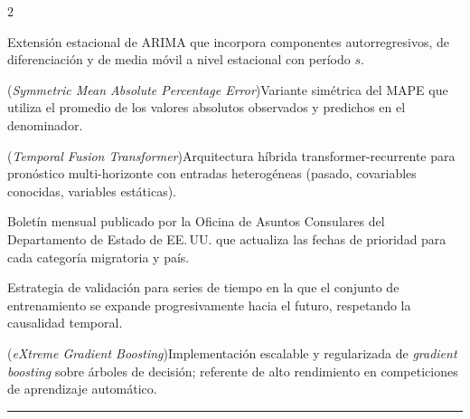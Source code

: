 \documentclass[12pt,letterpaper]{report}
\begin{document}
\begin{multicols}{2}
\begin{description}[leftmargin=0pt, labelindent=0pt, itemindent=0pt,
                    labelsep=0.4em, font=\bfseries\scriptsize,
                    itemsep=2pt, parsep=0pt, topsep=0pt]
    \item[SARIMA] Extensión estacional de ARIMA que incorpora componentes autorregresivos, de diferenciación y de media móvil a nivel estacional con período $s$.

    \item[sMAPE] (\textit{Symmetric Mean Absolute Percentage Error})\hspace{0.3em}Variante simétrica del MAPE que utiliza el promedio de los valores absolutos observados y predichos en el denominador.

    \item[TFT] (\textit{Temporal Fusion Transformer})\hspace{0.3em}Arquitectura híbrida transformer-recurrente para pronóstico multi-horizonte con entradas heterogéneas (pasado, covariables conocidas, variables estáticas).

    \item[\textit{Visa Bulletin}] Boletín mensual publicado por la Oficina de Asuntos Consulares del Departamento de Estado de EE.\,UU. que actualiza las fechas de prioridad para cada categoría migratoria y país.

    \item[Walk-forward Validation] Estrategia de validación para series de tiempo en la que el conjunto de entrenamiento se expande progresivamente hacia el futuro, respetando la causalidad temporal.

    \item[XGBoost] (\textit{eXtreme Gradient Boosting})\hspace{0.3em}Implementación escalable y regularizada de \textit{gradient boosting} sobre árboles de decisión; referente de alto rendimiento en competiciones de aprendizaje automático.
\end{description}
\end{multicols}

\newpage

\vspace{0.6cm}
\noindent{\Large\bfseries\textcolor{uacjblue}{Acerca del autor y del asesor}}
\par\vspace{0.35cm}
\noindent\textcolor{uacjblue}{\rule{\textwidth}{0.6pt}}
\par\vspace{0.35cm}
\end{document}
